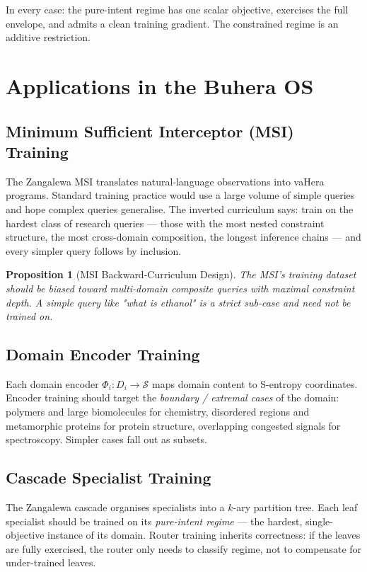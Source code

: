 \documentclass[11pt,twocolumn,a4paper]{article}
\newtheorem{proposition}[theorem]{Proposition}
\newcommand{\cS}{\mathcal{S}}
\begin{document}
In every case: the pure-intent regime has one scalar objective, exercises the full envelope, and admits a clean training gradient. The constrained regime is an additive restriction.


\section{Applications in the Buhera OS}
\label{sec:applications}

\subsection{Minimum Sufficient Interceptor (MSI) Training}

The Zangalewa MSI \cite{sachikonye2026msi} translates natural-language observations into vaHera programs. Standard training practice would use a large volume of simple queries and hope complex queries generalise. The inverted curriculum says: train on the hardest class of research queries --- those with the most nested constraint structure, the most cross-domain composition, the longest inference chains --- and every simpler query follows by inclusion.

\begin{proposition}[MSI Backward-Curriculum Design]
\label{prop:msi-curriculum}
The MSI's training dataset should be biased toward multi-domain composite queries with maximal constraint depth. A simple query like "what is ethanol" is a strict sub-case and need not be trained on.
\end{proposition}

\subsection{Domain Encoder Training}

Each domain encoder $\Phi_i: D_i \to \cS$ maps domain content to S-entropy coordinates. Encoder training should target the \emph{boundary / extremal cases} of the domain: polymers and large biomolecules for chemistry, disordered regions and metamorphic proteins for protein structure, overlapping congested signals for spectroscopy. Simpler cases fall out as subsets.

\subsection{Cascade Specialist Training}

The Zangalewa cascade \cite{sachikonye2026cascades} organises specialists into a $k$-ary partition tree. Each leaf specialist should be trained on its \emph{pure-intent regime} --- the hardest, single-objective instance of its domain. Router training inherits correctness: if the leaves are fully exercised, the router only needs to classify regime, not to compensate for under-trained leaves.
\end{document}
